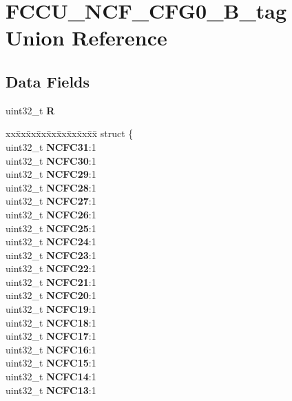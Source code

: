\hypertarget{unionFCCU__NCF__CFG0__32B__tag}{}\section{F\+C\+C\+U\+\_\+\+N\+C\+F\+\_\+\+C\+F\+G0\+\_\+B\+\_\+tag Union Reference}
\label{unionFCCU__NCF__CFG0__32B__tag}
\subsection*{Data Fields}
\begin{DoxyCompactItemize}
\item 
\mbox{\label{unionFCCU__NCF__CFG0__32B__tag_a7460e656c3e647c4faeea3feb10b386b}} 
uint32\+\_\+t {\bfseries R}
\item 
\mbox{\label{unionFCCU__NCF__CFG0__32B__tag_a6a28909ce0cbec93cbd1423bedebd249}} 
\begin{tabbing}
xx\=xx\=xx\=xx\=xx\=xx\=xx\=xx\=xx\=\kill
struct \{\\
\>uint32\_t {\bfseries NCFC31}:1\\
\>uint32\_t {\bfseries NCFC30}:1\\
\>uint32\_t {\bfseries NCFC29}:1\\
\>uint32\_t {\bfseries NCFC28}:1\\
\>uint32\_t {\bfseries NCFC27}:1\\
\>uint32\_t {\bfseries NCFC26}:1\\
\>uint32\_t {\bfseries NCFC25}:1\\
\>uint32\_t {\bfseries NCFC24}:1\\
\>uint32\_t {\bfseries NCFC23}:1\\
\>uint32\_t {\bfseries NCFC22}:1\\
\>uint32\_t {\bfseries NCFC21}:1\\
\>uint32\_t {\bfseries NCFC20}:1\\
\>uint32\_t {\bfseries NCFC19}:1\\
\>uint32\_t {\bfseries NCFC18}:1\\
\>uint32\_t {\bfseries NCFC17}:1\\
\>uint32\_t {\bfseries NCFC16}:1\\
\>uint32\_t {\bfseries NCFC15}:1\\
\>uint32\_t {\bfseries NCFC14}:1\\
\>uint32\_t {\bfseries NCFC13}:1\\

\end{tabbing}
\end{DoxyCompactItemize}
